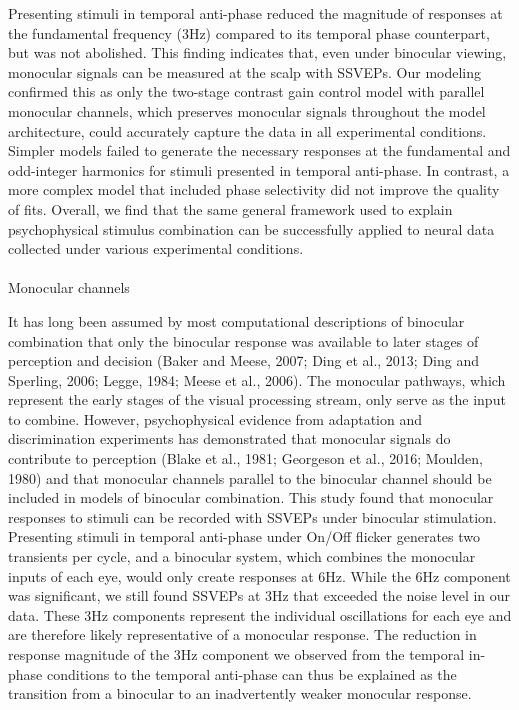 \documentclass[
  12pt,
]{article}
\makeatletter
\let\oldparagraph\paragraph
\renewcommand{\paragraph}{
    \@ifstar
      \xxxParagraphStar
      \xxxParagraphNoStar
  }
\newcommand{\xxxParagraphStar}[1]{\oldparagraph*{#1}\mbox{}}
\newcommand{\xxxParagraphNoStar}[1]{\oldparagraph{#1}\mbox{}}
\makeatother
\begin{document}
Presenting stimuli in temporal anti-phase reduced the magnitude of
responses at the fundamental frequency (3Hz) compared to its temporal
phase counterpart, but was not abolished. This finding indicates that,
even under binocular viewing, monocular signals can be measured at the
scalp with SSVEPs. Our modeling confirmed this as only the two-stage
contrast gain control model with parallel monocular channels, which
preserves monocular signals throughout the model architecture, could
accurately capture the data in all experimental conditions. Simpler
models failed to generate the necessary responses at the fundamental and
odd-integer harmonics for stimuli presented in temporal anti-phase. In
contrast, a more complex model that included phase selectivity did not
improve the quality of fits. Overall, we find that the same general
framework used to explain psychophysical stimulus combination can be
successfully applied to neural data collected under various experimental
conditions.

\paragraph{Monocular channels}\label{monocular-channels}

It has long been assumed by most computational descriptions of binocular
combination that only the binocular response was available to later
stages of perception and decision (Baker and Meese, 2007; Ding et al.,
2013; Ding and Sperling, 2006; Legge, 1984; Meese et al., 2006). The
monocular pathways, which represent the early stages of the visual
processing stream, only serve as the input to combine. However,
psychophysical evidence from adaptation and discrimination experiments
has demonstrated that monocular signals do contribute to perception
(Blake et al., 1981; Georgeson et al., 2016; Moulden, 1980) and that
monocular channels parallel to the binocular channel should be included
in models of binocular combination. This study found that monocular
responses to stimuli can be recorded with SSVEPs under binocular
stimulation. Presenting stimuli in temporal anti-phase under On/Off
flicker generates two transients per cycle, and a binocular system,
which combines the monocular inputs of each eye, would only create
responses at 6Hz. While the 6Hz component was significant, we still
found SSVEPs at 3Hz that exceeded the noise level in our data. These 3Hz
components represent the individual oscillations for each eye and are
therefore likely representative of a monocular response. The reduction
in response magnitude of the 3Hz component we observed from the temporal
in-phase conditions to the temporal anti-phase can thus be explained as
the transition from a binocular to an inadvertently weaker monocular
response.
\end{document}
